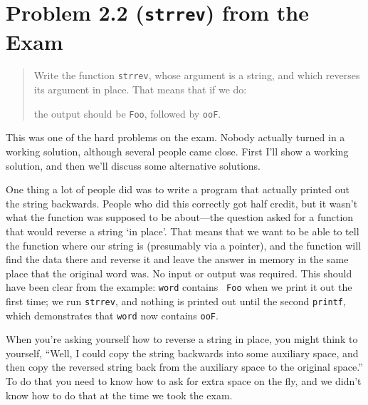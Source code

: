 %
%
%

\section{Problem 2.2 ({\tt strrev}) from the Exam}

\begin{quotation}
\small
Write the function {\tt strrev}, whose argument is a string, and which
reverses its argument in place.  That means that if we do:

\noindent the output should be {\tt Foo}, followed by {\tt ooF}.
\end{quotation}

This was one of the hard problems on the exam.  Nobody actually turned
in a working solution, although several people came close.  First I'll
show a working solution, and then we'll discuss some alternative
solutions.

One thing a lot of people did was to write a program that actually
printed out the string backwards.  People who did this correctly got
half credit, but it wasn't what the function was supposed to be
about---the question asked for a function that would reverse a string
`in place'.  That means that we want to be able to tell the function
where our string is (presumably via a pointer), and the function will
find the data there and reverse it and leave the answer in memory in the
same place that the original word was.  No input or output was required.
This should have been clear from the example:  {\tt word} contains {\tt
Foo} when we print it out the first time; we run {\tt strrev}, and
nothing is printed out until the second {\tt printf}, which demonstrates
that {\tt word} now contains {\tt ooF}. 

When you're asking yourself how to reverse a string in place, you might
think to yourself, ``Well, I could copy the string backwards into some
auxiliary space, and then copy the reversed string back from the
auxiliary space to the original space.''  To do that you need to know
how to ask for extra space on the fly, and we didn't know how to do that
at the time we took the exam.

